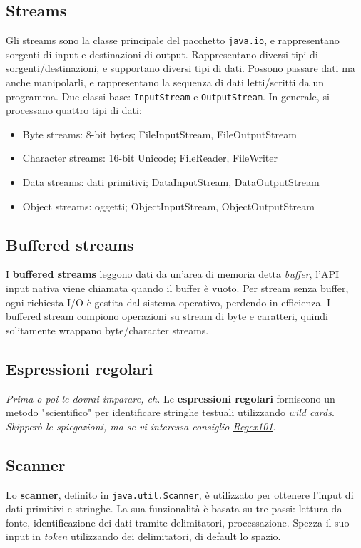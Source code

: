 \documentclass[11pt]{article}
\newcommand{\code}[1]{\texttt{#1}}
\begin{document}
\subsection{Streams}
Gli streams sono la classe principale del pacchetto \code{java.io}, e rappresentano sorgenti di input e destinazioni di output. Rappresentano diversi tipi di sorgenti/destinazioni, e supportano diversi tipi di dati. Possono passare dati ma anche manipolarli, e rappresentano la sequenza di dati letti/scritti da un programma. Due classi base: \code{InputStream} e \code{OutputStream}. In generale, si processano quattro tipi di dati:
\begin{itemize}
    \item Byte streams: 8-bit bytes; FileInputStream, FileOutputStream
    \item Character streams: 16-bit Unicode; FileReader, FileWriter
    \item Data streams: dati primitivi; DataInputStream, DataOutputStream
    \item Object streams: oggetti; ObjectInputStream, ObjectOutputStream
\end{itemize}
\subsection{Buffered streams}
I \textbf{buffered streams} leggono dati da un'area di memoria detta \textit{buffer}, l'API input nativa viene chiamata quando il buffer è vuoto. Per stream senza buffer, ogni richiesta I/O è gestita dal sistema operativo, perdendo in efficienza. I buffered stream compiono operazioni su stream di byte e caratteri, quindi solitamente wrappano byte/character streams.
\subsection{Espressioni regolari}
\textit{Prima o poi le dovrai imparare, eh.} Le \textbf{espressioni regolari} forniscono un metodo "scientifico" per identificare stringhe testuali utilizzando \textit{wild cards}. \textit{Skipperò le spiegazioni, ma se vi interessa consiglio \href{https://regex101.com}{Regex101}}.
\subsection{Scanner}
Lo \textbf{scanner}, definito in \code{java.util.Scanner}, è utilizzato per ottenere l'input di dati primitivi e stringhe. La sua funzionalità è basata su tre passi: lettura da fonte, identificazione dei dati tramite delimitatori, processazione. Spezza il suo input in \textit{token} utilizzando dei delimitatori, di default lo spazio.
\end{document}
